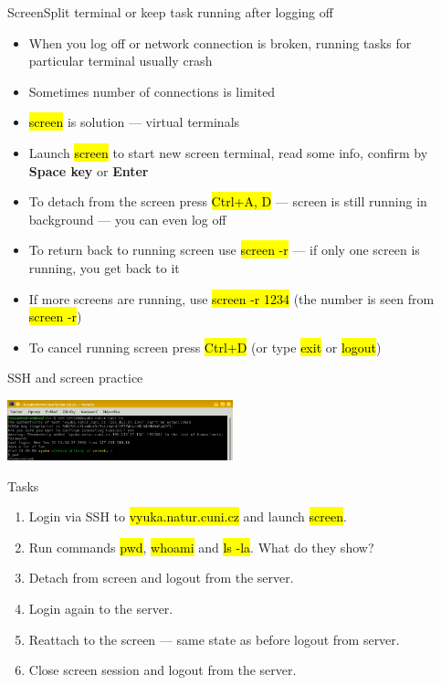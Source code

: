 \documentclass[compress, ucs, xelatex, 11pt, xcolor=svgnames,
  hyperref={
    bookmarks=true,
    unicode=true,
    colorlinks=true,
    pdftitle={Linux, command line and MetaCentrum},
    plainpages=false,
    pdfauthor={Vojtech Zeisek},
    pdfsubject={Course about use of Linux command line, writing shell scripts and using MetaCentrum of CESNET},
    pdfcreator={XeLaTeX},
    pdfkeywords={Linux, GNU, BASH, shell, command line, MetaCentrum},
    linkcolor=DarkRed,
    anchorcolor=DarkBlue,
    citecolor=Indigo,
    filecolor=NavyBlue,
    menucolor=DarkMagenta,
    urlcolor=DarkBlue,
    pdftex},
  url={hyphens, lowtilde} %
  ]{beamer}
\renewcommand{\texttt}[1]{\hl{\ttfamily #1}}
\begin{document}
\begin{frame}{Screen}{Split terminal or keep task running after logging off}
  \begin{itemize}
    \item When you log off or network connection is broken, running tasks for particular terminal usually crash
    \item Sometimes number of connections is limited
    \item \texttt{screen} is solution --- virtual terminals
    \item Launch \texttt{screen} to start new screen terminal, read some info, confirm by \textbf{Space key} or \textbf{Enter}
    \item To detach from the screen press \texttt{Ctrl+A, D} --- screen is still running in background --- you can even log off
    \item To return back to running screen use \texttt{screen -r} --- if only one screen is running, you get back to it
    \item If more screens are running, use \texttt{screen -r 1234} (the number is seen from \texttt{screen -r})
    \item To cancel running screen press \texttt{Ctrl+D} (or type \texttt{exit} or \texttt{logout})
  \end{itemize}
\end{frame}

\begin{frame}{SSH and screen practice}
  \begin{center}
    \includegraphics[height=1.75cm]{sshterm.png}
  \end{center}
  \begin{block}{Tasks}
    \begin{enumerate}
      \item Login via SSH to \texttt{vyuka.natur.cuni.cz} and launch \texttt{screen}.
      \item Run commands \texttt{pwd}, \texttt{whoami} and \texttt{ls -la}. What do they show?
      \item Detach from screen and logout from the server.
      \item Login again to the server.
      \item Reattach to the screen --- same state as before logout from server.
      \item Close screen session and logout from the server.
    \end{enumerate}
  \end{block}
\end{frame}
\end{document}
